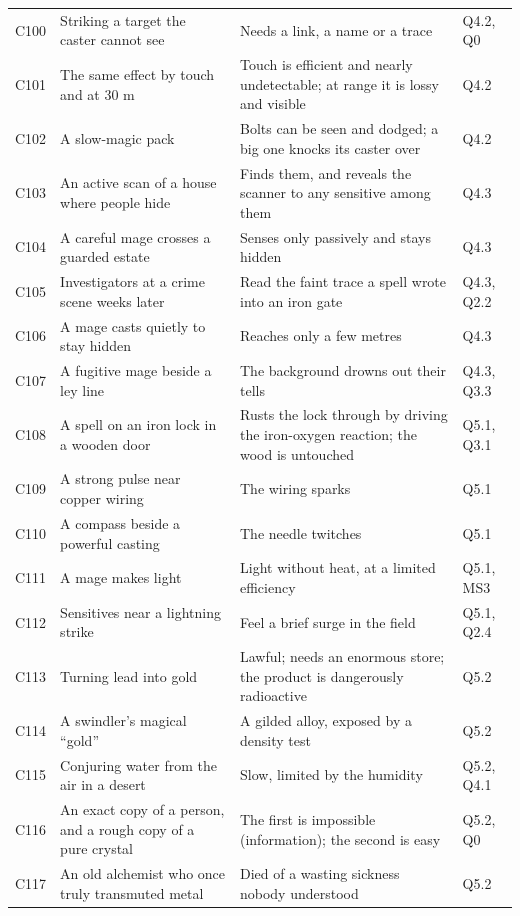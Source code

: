 \begin{longtable}{@{}>{\raggedright\arraybackslash}p{}>{\raggedright\arraybackslash}p{}>{\raggedright\arraybackslash}p{}>{\raggedright\arraybackslash}p{}@{}}
C100 & Striking a target the caster cannot see & Needs a link, a name or a trace & Q4.2, Q0\\
C101 & The same effect by touch and at 30 m & Touch is efficient and nearly undetectable; at range it is lossy and visible & Q4.2\\
C102 & A slow-magic pack & Bolts can be seen and dodged; a big one knocks its caster over & Q4.2\\
C103 & An active scan of a house where people hide & Finds them, and reveals the scanner to any sensitive among them & Q4.3\\
C104 & A careful mage crosses a guarded estate & Senses only passively and stays hidden & Q4.3\\
C105 & Investigators at a crime scene weeks later & Read the faint trace a spell wrote into an iron gate & Q4.3, Q2.2\\
C106 & A mage casts quietly to stay hidden & Reaches only a few metres & Q4.3\\
C107 & A fugitive mage beside a ley line & The background drowns out their tells & Q4.3, Q3.3\\
C108 & A spell on an iron lock in a wooden door & Rusts the lock through by driving the iron-oxygen reaction; the wood is untouched & Q5.1, Q3.1\\
C109 & A strong pulse near copper wiring & The wiring sparks & Q5.1\\
C110 & A compass beside a powerful casting & The needle twitches & Q5.1\\
C111 & A mage makes light & Light without heat, at a limited efficiency & Q5.1, MS3\\
C112 & Sensitives near a lightning strike & Feel a brief surge in the field & Q5.1, Q2.4\\
C113 & Turning lead into gold & Lawful; needs an enormous store; the product is dangerously radioactive & Q5.2\\
C114 & A swindler's magical ``gold'' & A gilded alloy, exposed by a density test & Q5.2\\
C115 & Conjuring water from the air in a desert & Slow, limited by the humidity & Q5.2, Q4.1\\
C116 & An exact copy of a person, and a rough copy of a pure crystal & The first is impossible (information); the second is easy & Q5.2, Q0\\
C117 & An old alchemist who once truly transmuted metal & Died of a wasting sickness nobody understood & Q5.2\\
\end{longtable}
